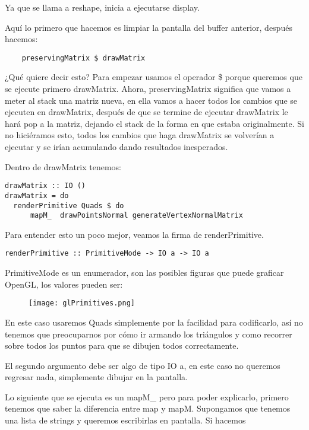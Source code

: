 \documentclass{article}
\begin{document}
Ya que se llama a reshape, inicia a ejecutarse display.

Aquí lo primero que hacemos es limpiar la pantalla del buffer anterior, después hacemos:

\begin{verbatim}
    preservingMatrix $ drawMatrix
\end{verbatim}

¿Qué quiere decir esto? Para empezar usamos el operador \$ porque queremos que se ejecute primero drawMatrix. Ahora, preservingMatrix significa que vamos a meter al stack una matriz nueva, en ella vamos a hacer todos los cambios que se ejecuten en drawMatrix, después de que se termine de ejecutar drawMatrix le hará pop a la matriz, dejando el stack de la forma en que estaba originalmente. Si no hiciéramos esto, todos los cambios que haga drawMatrix se volverían a ejecutar y se irían acumulando dando resultados inesperados.

Dentro de drawMatrix tenemos:

\begin{verbatim}
drawMatrix :: IO ()
drawMatrix = do
  renderPrimitive Quads $ do
      mapM_  drawPointsNormal generateVertexNormalMatrix
\end{verbatim}

Para entender esto un poco mejor, veamos la firma de renderPrimitive. 
\begin{verbatim}
renderPrimitive :: PrimitiveMode -> IO a -> IO a    
\end{verbatim}
PrimitiveMode es un enumerador, son las posibles figuras que puede graficar OpenGL, los valores pueden ser:

\begin{figure}[h!]
    \centering
    \texttt{[image: glPrimitives.png]}
\end{figure}

En este caso usaremos Quads simplemente por la facilidad para codificarlo, así no tenemos que preocuparnos por cómo ir armando los triángulos y como recorrer sobre todos los puntos para que se dibujen todos correctamente. 

El segundo argumento debe ser algo de tipo IO a, en este caso no queremos regresar nada, simplemente dibujar en la pantalla.

Lo siguiente que se ejecuta es un mapM\_ pero para poder explicarlo, primero tenemos que saber la diferencia entre map y mapM. Supongamos que tenemos una lista de strings y queremos escribirlas en pantalla. Si hacemos
\end{document}
